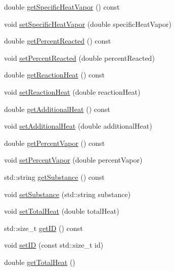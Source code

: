 \begin{DoxyCompactItemize}
\item 
double \hyperlink{class_gas_load_charge_material_a9a07e86938bb831e51ac3f53f696a3c3}{get\+Specific\+Heat\+Vapor} () const
\item 
void \hyperlink{class_gas_load_charge_material_a7498eba84bb8bdfc5344f0e44418260b}{set\+Specific\+Heat\+Vapor} (double specific\+Heat\+Vapor)
\item 
double \hyperlink{class_gas_load_charge_material_af47b4c6c3e547325cadd81cbb09937ee}{get\+Percent\+Reacted} () const
\item 
void \hyperlink{class_gas_load_charge_material_a7142cb6bbfba53d640dd6f1590fe32f6}{set\+Percent\+Reacted} (double percent\+Reacted)
\item 
double \hyperlink{class_gas_load_charge_material_a605eaf21d1f25f27b53627aeb903c93d}{get\+Reaction\+Heat} () const
\item 
void \hyperlink{class_gas_load_charge_material_a721f02cbd0bfbb6ebe67c0da09f0b0f2}{set\+Reaction\+Heat} (double reaction\+Heat)
\item 
double \hyperlink{class_gas_load_charge_material_a5c01f171b61c01c93db6453cb122e1ba}{get\+Additional\+Heat} () const
\item 
void \hyperlink{class_gas_load_charge_material_a08ef5196ea9919dfc71be6744c7da08e}{set\+Additional\+Heat} (double additional\+Heat)
\item 
double \hyperlink{class_gas_load_charge_material_a19b8ecfad235b5824b0a88903cff667a}{get\+Percent\+Vapor} () const
\item 
void \hyperlink{class_gas_load_charge_material_acace81e16ef531acb0a68462ab0ed25d}{set\+Percent\+Vapor} (double percent\+Vapor)
\item 
std\+::string \hyperlink{class_gas_load_charge_material_a5f967841f196f6b0b35f32f9610092e3}{get\+Substance} () const
\item 
void \hyperlink{class_gas_load_charge_material_a20cc3df601d8daae9b8f8e7b0c53c2e3}{set\+Substance} (std\+::string substance)
\item 
void \hyperlink{class_gas_load_charge_material_aae01f6f4f923965c111e1dac66eb8365}{set\+Total\+Heat} (double total\+Heat)
\item 
std\+::size\+\_\+t \hyperlink{class_gas_load_charge_material_a32dc0d73857ebe4322cf525064713cf6}{get\+ID} () const
\item 
void \hyperlink{class_gas_load_charge_material_a24b43ba7c871453258f458a8c1f15232}{set\+ID} (const std\+::size\+\_\+t id)
\item 
double \hyperlink{class_gas_load_charge_material_a4f831537652ca09c4539982c626cc164}{get\+Total\+Heat} ()

\end{DoxyCompactItemize}

